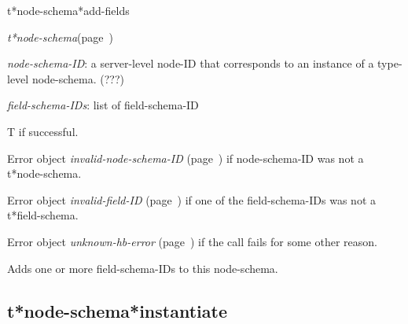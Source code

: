 \begin{description}
\item [Name:]  t*node-schema*add-fields

\item [Class:] {\sl t*node-schema}\hfill(page~\pageref{t*node-schema})

\item [Parameters:]
\item {\sl node-schema-ID}:  a server-level node-ID that corresponds to an 
instance of a type-level node-schema. (???)


\item {\sl field-schema-IDs}:  list of field-schema-ID


\item [Return-value:] 
T if successful.

Error object {\sl invalid-node-schema-ID} (page~\pageref{invalid-node-schema-ID}) if 
node-schema-ID was not a t*node-schema.

Error object {\sl invalid-field-ID} (page~\pageref{invalid-field-ID}) if one of the 
field-schema-IDs was not a t*field-schema.

Error object {\sl unknown-hb-error} (page~\pageref{unknown-hb-error}) if the call 
fails for some other reason. 

\item [Description:]  Adds one or more field-schema-IDs to 
this node-schema.

\item [Public:]



\end{description}
\horizontalline

\subsection{t*node-schema*instantiate}
\label{t*node-schema*instantiate}


